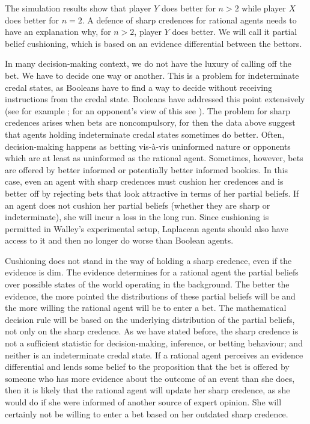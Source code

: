 \documentclass[11pt]{article}
\begin{document}
The simulation results show that player $Y$ does better for $n>2$
while player $X$ does better for $n=2$. A defence of sharp credences
for rational agents needs to have an explanation why, for $n>2$,
player $Y$ does better. We will call it partial belief cushioning,
which is based on an evidence differential between the bettors.

In many decision-making context, we do not have the luxury of calling
off the bet. We have to decide one way or another. This is a problem
for indeterminate credal states, as Booleans have to find a way to
decide without receiving instructions from the credal state. Booleans
have addressed this point extensively (see for example
; for an opponent's view of this see
). The problem for sharp credences arises when
bets are noncompulsory, for then the data above suggest that agents
holding indeterminate credal states sometimes do better. Often,
decision-making happens as betting vis-{\`a}-vis uninformed nature or
opponents which are at least as uninformed as the rational agent.
Sometimes, however, bets are offered by better informed or potentially
better informed bookies. In this case, even an agent with sharp
credences must cushion her credences and is better off by rejecting
bets that look attractive in terms of her partial beliefs. If an agent
does not cushion her partial beliefs (whether they are sharp or
indeterminate), she will incur a loss in the long run. Since
cushioning is permitted in Walley's experimental setup, Laplacean
agents should also have access to it and then no longer do worse than
Boolean agents.

Cushioning does not stand in the way of holding a sharp credence, even
if the evidence is dim. The evidence determines for a rational agent
the partial beliefs over possible states of the world operating in the
background. The better the evidence, the more pointed the
distributions of these partial beliefs will be and the more willing
the rational agent will be to enter a bet. The mathematical decision
rule will be based on the underlying distribution of the partial
beliefs, not only on the sharp credence. As we have stated before, the
sharp credence is not a sufficient statistic for decision-making,
inference, or betting behaviour; and neither is an indeterminate
credal state. If a rational agent perceives an evidence differential
and lends some belief to the proposition that the bet is offered by
someone who has more evidence about the outcome of an event than she
does, then it is likely that the rational agent will update her sharp
credence, as she would do if she were informed of another source of
expert opinion. She will certainly not be willing to enter a bet based
on her outdated sharp credence.
\end{document}
